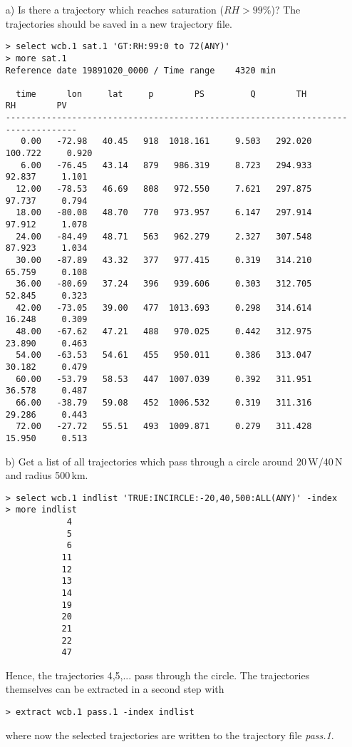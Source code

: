 \documentclass[a4paper,10pt]{article}
\begin{document}
\begin{itemize}
\item[a)] Is there a trajectory which reaches saturation ($RH>99$\%)? The trajectories should be saved in a new trajectory file.
\begin{verbatim}
> select wcb.1 sat.1 'GT:RH:99:0 to 72(ANY)'
> more sat.1
Reference date 19891020_0000 / Time range    4320 min

  time      lon     lat     p        PS         Q        TH        RH        PV   
---------------------------------------------------------------------------------
   0.00   -72.98   40.45   918  1018.161     9.503   292.020   100.722     0.920    
   6.00   -76.45   43.14   879   986.319     8.723   294.933    92.837     1.101    
  12.00   -78.53   46.69   808   972.550     7.621   297.875    97.737     0.794    
  18.00   -80.08   48.70   770   973.957     6.147   297.914    97.912     1.078    
  24.00   -84.49   48.71   563   962.279     2.327   307.548    87.923     1.034    
  30.00   -87.89   43.32   377   977.415     0.319   314.210    65.759     0.108    
  36.00   -80.69   37.24   396   939.606     0.303   312.705    52.845     0.323    
  42.00   -73.05   39.00   477  1013.693     0.298   314.614    16.248     0.309    
  48.00   -67.62   47.21   488   970.025     0.442   312.975    23.890     0.463    
  54.00   -63.53   54.61   455   950.011     0.386   313.047    30.182     0.479    
  60.00   -53.79   58.53   447  1007.039     0.392   311.951    36.578     0.487    
  66.00   -38.79   59.08   452  1006.532     0.319   311.316    29.286     0.443    
  72.00   -27.72   55.51   493  1009.871     0.279   311.428    15.950     0.513    
\end{verbatim}

\item[b)] Get a list of all trajectories which pass through a circle around 20\,W/40\,N and radius 500\,km.
\begin{verbatim}
> select wcb.1 indlist 'TRUE:INCIRCLE:-20,40,500:ALL(ANY)' -index
> more indlist
            4
            5
            6
           11
           12
           13
           14
           19
           20
           21
           22
           47
\end{verbatim}
Hence, the trajectories 4,5,... pass through the circle. The trajectories themselves can be extracted in a second step with
\begin{verbatim}
> extract wcb.1 pass.1 -index indlist
\end{verbatim}
where now the selected trajectories are written to the trajectory file {\em pass.1}.


\end{itemize}
\end{document}
